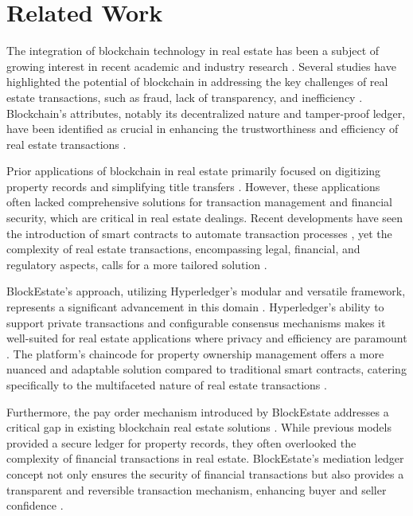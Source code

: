 \documentclass[3p,times]{elsarticle}
\begin{document}
\section{Related Work}

The integration of blockchain technology in real estate has been a subject of growing interest in recent academic and industry research \cite{podshivalov2022improving}. Several studies have highlighted the potential of blockchain in addressing the key challenges of real estate transactions, such as fraud, lack of transparency, and inefficiency \cite{wouda2019blockchain}. Blockchain’s attributes, notably its decentralized nature and tamper-proof ledger, have been identified as crucial in enhancing the trustworthiness and efficiency of real estate transactions \cite{latifi2019blockchain}.

Prior applications of blockchain in real estate primarily focused on digitizing property records and simplifying title transfers \cite{konashevych2020constraints}. However, these applications often lacked comprehensive solutions for transaction management and financial security, which are critical in real estate dealings. Recent developments have seen the introduction of smart contracts to automate transaction processes \cite{veuger2020dutch}, yet the complexity of real estate transactions, encompassing legal, financial, and regulatory aspects, calls for a more tailored solution \cite{jeong2021implementation}.

BlockEstate's approach, utilizing Hyperledger’s modular and versatile framework, represents a significant advancement in this domain \cite{mittal2020real}. Hyperledger’s ability to support private transactions and configurable consensus mechanisms makes it well-suited for real estate applications where privacy and efficiency are paramount \cite{gupta2020tokenization}. The platform’s chaincode for property ownership management offers a more nuanced and adaptable solution compared to traditional smart contracts, catering specifically to the multifaceted nature of real estate transactions \cite{huh2020verification}.

Furthermore, the pay order mechanism introduced by BlockEstate addresses a critical gap in existing blockchain real estate solutions \cite{pankratov2020blockchain}. While previous models provided a secure ledger for property records, they often overlooked the complexity of financial transactions in real estate. BlockEstate’s mediation ledger concept not only ensures the security of financial transactions but also provides a transparent and reversible transaction mechanism, enhancing buyer and seller confidence \cite{ahmad2021real}.
\end{document}
